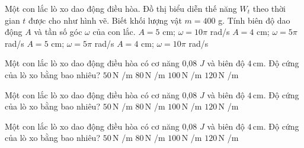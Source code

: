 \begin{ex}
Một con lắc lò xo dao động điều hòa. Đồ thị biểu diễn thế năng $W_t$ theo thời gian $t$ được cho như hình vẽ. Biết khối lượng vật $m = 400$ g. Tính biên độ dao động $A$ và tần số góc $\omega$ của con lắc.
\choice
{$A = 5$ cm; $\omega = 10\pi$ rad/s}
{\True $A = 4$ cm; $\omega = 5\pi$ rad/s}
{$A = 5$ cm; $\omega = 5\pi$ rad/s}
{$A = 4$ cm; $\omega = 10\pi$ rad/s}
\end{ex}

\begin{ex}
Một con lắc lò xo dao động điều hòa có cơ năng 0,08 $J$ và biên độ $4\,\text{cm}$. Độ cứng của lò xo bằng bao nhiêu?
\choice
{$50\,\text{N}$ /m}
{$80\,\text{N}$ /m}
{\True $100\,\text{N}$ /m}
{$120\,\text{N}$ /m}
\end{ex}

\begin{ex}
Một con lắc lò xo dao động điều hòa có cơ năng 0,08 $J$ và biên độ $4\,\text{cm}$. Độ cứng của lò xo bằng bao nhiêu?
\choice
{$50\,\text{N}$ /m}
{$80\,\text{N}$ /m}
{\True $100\,\text{N}$ /m}
{$120\,\text{N}$ /m}
\end{ex}

\begin{ex}
Một con lắc lò xo dao động điều hòa có cơ năng 0,08 $J$ và biên độ $4\,\text{cm}$. Độ cứng của lò xo bằng bao nhiêu?
\choice
{$50\,\text{N}$ /m}
{$80\,\text{N}$ /m}
{\True $100\,\text{N}$ /m}
{$120\,\text{N}$ /m}
\end{ex}

